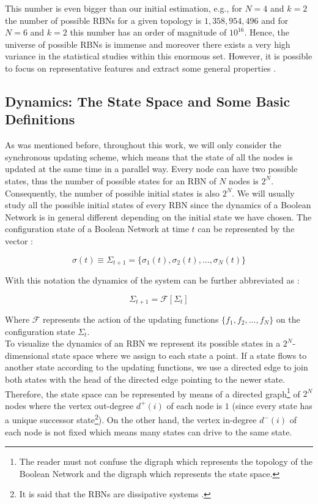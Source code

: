 This number is even bigger than our initial estimation, e.g., for $N=4$ and $k=2$ the number of possible RBNs for a given topology is $1,358,954,496$ and for $N=6$ and $k=2$ this number has an order of magnitude of $10^{16}$. Hence, the universe of possible RBNs is immense and moreover there exists a very high variance in the statistical studies within this enormous set. However, it is possible to focus on representative features and extract some general properties \cite{rbn_barbara}.

\subsection{Dynamics: The State Space and Some Basic Definitions}
\label{dynamics_ex_rbn}
As was mentioned before, throughout this work, we will only consider the synchronous updating scheme, which means that the state of all the nodes is updated at the same time in a parallel way. Every node can have two possible states, thus the number of possible states for an RBN of $N$ nodes is $2^{N}$. Consequently, the number of possible initial states is also $2^{N}$. We will usually study all the possible initial states of every RBN since the dynamics of a Boolean Network is in general different depending on the initial state we have chosen. The configuration state of a Boolean Network at time $t$ can be represented by the vector \cite{bool_net}:

\begin{equation}
\sigma(t)\equiv \Sigma_{t+1}=\{\sigma_{1}(t),\sigma_{2}(t),...,\sigma_{N}(t)\}
\end{equation}

With this notation the dynamics of the system can be further abbreviated as \cite{rbn_aldana}:

\begin{equation}
\Sigma_{t+1}=\mathcal{F} [\Sigma_{t}]
\end{equation}

Where $\mathcal{F}$ represents the action of the updating functions $\{f_{1},f_{2},...,f_{N} \}$ on the configuration state $\Sigma_{t}$.\\

To visualize the dynamics of an RBN we represent its possible states in a $2^{N}$-dimensional state space where we assign to each state a point. If a state flows to another state according to the updating functions, we use a directed edge to join both states with the head of the directed edge pointing to the newer state. Therefore, the state space can be represented by means of a directed graph\footnote{The reader must not confuse the digraph which represents the topology of the Boolean Network and the digraph which represents the state space.} of $2^{N}$ nodes where the vertex out-degree $ d^{+} (i)$ of each node is $1$ (since every state has a unique successor state\footnote{It is said that the RBNs are dissipative systems \cite{rbn_carlos}.}). On the other hand, the vertex in-degree $ d^{-} (i)$ of each node is not fixed which means many states can drive to the same state.

